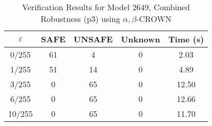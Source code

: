 \begin{table}[htbp]
\centering
\caption{Verification Results for Model 2649, Combined Robustness (p3) using $\alpha,\beta$-CROWN}
\label{tab:model2649_p3_abcrown}
\begin{tabular}{|c|c|c|c|c|}
\hline
$\varepsilon$ & SAFE & UNSAFE & Unknown & Time (s) \\ \hline
0/255 & 61 & 4 & 0 & 2.03 \\ \hline
1/255 & 51 & 14 & 0 & 4.89 \\ \hline
3/255 & 0 & 65 & 0 & 12.50 \\ \hline
6/255 & 0 & 65 & 0 & 12.66 \\ \hline
10/255 & 0 & 65 & 0 & 11.70 \\ \hline
\end{tabular}
\end{table}
